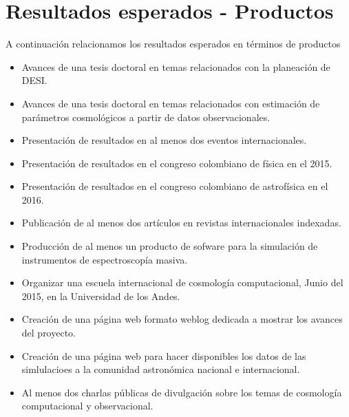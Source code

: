 
\section{Resultados esperados - Productos}


A continuaci\'on relacionamos los resultados esperados en términos de productos 

\begin{itemize}
\item Avances de una tesis doctoral en temas relacionados con la
  planeaci\'on de DESI. 

\item Avances de una tesis doctoral en temas relacionados con
  estimaci\'on de par\'ametros cosmol\'ogicos a partir de datos
  observacionales. 

\item Presentaci\'on de resultados en al menos dos eventos
  internacionales.  

\item Presentaci\'on de resultados en el congreso colombiano de
  f\'isica en el 2015.   

\item Presentaci\'on de resultados en el congreso colombiano de
  astrof\'isica en el 2016.  

\item Publicaci\'on de al menos dos art\'iculos en revistas
  internacionales indexadas. 

\item Producci\'on de al menos un producto de sofware para la
  simulaci\'on de instrumentos de espectroscop\'ia masiva.  

\item Organizar una escuela internacional de cosmolog\'ia
  computacional, Junio del 2015, en la Universidad de los Andes.  

\item Creaci\'on de una p\'agina web formato weblog dedicada a mostrar
  los avances del proyecto. 

\item Creaci\'on de una p\'agina web para hacer disponibles los datos
  de las simlulacioes a la comunidad astron\'omica nacional e
  internacional. 

\item Al menos dos charlas p\'ublicas de divulgaci\'on sobre los temas
  de cosmolog\'ia computacional y observacional. 



\end{itemize}
